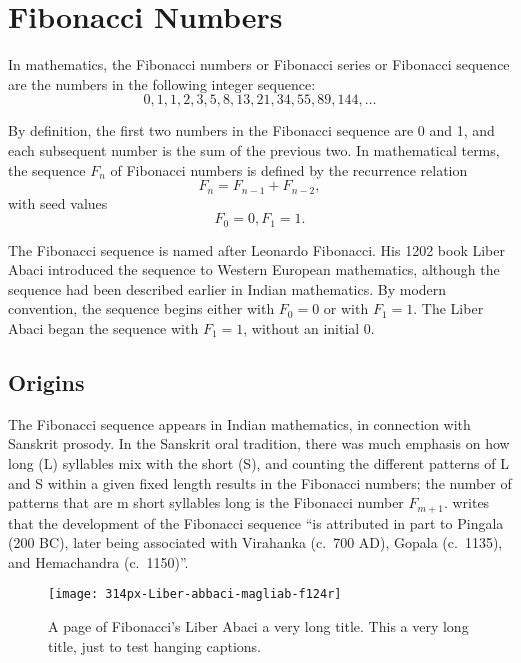 \chapter{Fibonacci Numbers}

In mathematics, the Fibonacci numbers or Fibonacci series or Fibonacci sequence are the numbers in the following integer sequence:
%
\begin{equation*} %
0, 1, 1, 2, 3,5,8,13,21,34,55,89,144,\ldots
\end{equation*}

By definition, the first two numbers in the Fibonacci sequence are 0 and 1, and each subsequent number is the sum of the previous two. In mathematical terms, the sequence $F_n$ of Fibonacci numbers is defined by the recurrence relation
%
\begin{equation}
F_n = F_{n-1} + F_{n-2},
\end{equation}
%
with seed values
%
\begin{equation}
F_0 = 0, F_1 = 1.
\end{equation}

The Fibonacci sequence is named after Leonardo Fibonacci. His 1202 book Liber Abaci introduced the sequence to Western European mathematics, although the sequence had been described earlier in Indian mathematics. \cite{Goonatilake:1998} By modern convention, the sequence begins either with $F_0 = 0$ or with $F_1 = 1$. The Liber Abaci began the sequence with $F_1 = 1$, without an initial 0.


\section{Origins}

The Fibonacci sequence appears in Indian mathematics, in connection with Sanskrit prosody. \cite{Singh:1985} In the Sanskrit oral tradition, there was much emphasis on how long (L) syllables mix with the short (S), and counting the different patterns of L and S within a given fixed length results in the Fibonacci numbers; the number of patterns that are m short syllables long is the Fibonacci number $F_{m + 1}$.
\citet{Goonatilake:1998} writes that the development of the Fibonacci sequence ``is attributed in part to Pingala (200 BC), later being associated with Virahanka (c.~700 AD), Gopala (c.~1135), and Hemachandra (c.~1150)''.

\begin{figure}[hbt!]
\centering
\texttt{[image: 314px-Liber-abbaci-magliab-f124r]}
\caption{A page of Fibonacci's Liber Abaci a very long title. This a very long title, just to test hanging captions.}

\end{figure}

